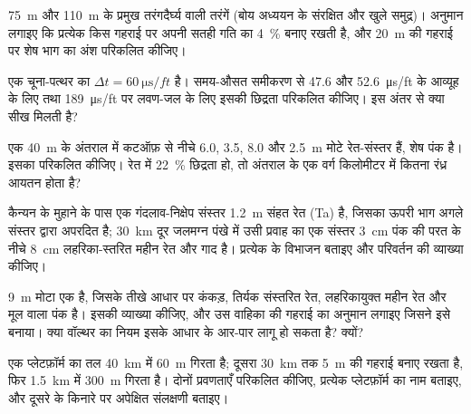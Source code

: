 \begin{exercise}[$\star$]\label{exo:b3:facies-models:4}
\qty{75}{m} और \qty{110}{m} के प्रमुख तरंगदैर्घ्य वाली तरंगें (बोय अध्ययन के
संरक्षित और खुले समुद्र)। अनुमान लगाइए कि प्रत्येक किस गहराई पर
अपनी सतही गति का \qty{4}{\percent} बनाए रखती है, और
\qty{20}{m} की गहराई पर शेष भाग का अंश परिकलित कीजिए।
\end{exercise}

\begin{exercise}[$\star\star$]\label{exo:b3:facies-models:5}
एक चूना-पत्थर का $\Delta t = \qty{60}{\micro\second/ft}$ है। समय-औसत समीकरण से
47.6 और \qty{52.6}{\micro\second/ft} के आव्यूह के लिए तथा
\qty{189}{\micro\second/ft} पर लवण-जल के लिए इसकी छिद्रता परिकलित कीजिए।
इस अंतर से क्या सीख मिलती है?
\end{exercise}

\begin{exercise}[$\star\star$]\label{exo:b3:facies-models:6}
एक \qty{40}{m} के अंतराल में कटऑफ़ से नीचे 6.0, 3.5, 8.0 और \qty{2.5}{m} मोटे
रेत-संस्तर हैं, शेष पंक है। इसका  परिकलित कीजिए।
रेत में \qty{22}{\percent} छिद्रता हो, तो अंतराल के एक
वर्ग किलोमीटर में कितना रंध्र आयतन होता है?
\end{exercise}

\begin{exercise}[$\star\star$]\label{exo:b3:facies-models:7}
कैन्यन के मुहाने के पास एक गंदलाव-निक्षेप संस्तर \qty{1.2}{m} संहत रेत (Ta) है,
जिसका ऊपरी भाग अगले संस्तर द्वारा अपरदित है; \qty{30}{km} दूर जलमग्न पंखे में उसी प्रवाह का
एक संस्तर \qty{3}{cm} पंक की परत के नीचे \qty{8}{cm} लहरिका-स्तरित महीन रेत और गाद है।
प्रत्येक के विभाजन बताइए और परिवर्तन की व्याख्या कीजिए।
\end{exercise}

\begin{exercise}[$\star\star$]\label{exo:b3:facies-models:8}
\qty{9}{m} मोटा एक  है, जिसके तीखे आधार पर कंकड़,
तिर्यक संस्तरित रेत, लहरिकायुक्त महीन रेत और मूल वाला पंक है। इसकी व्याख्या कीजिए,
और उस वाहिका की गहराई का अनुमान लगाइए जिसने इसे बनाया। क्या वॉल्थर का नियम इसके
आधार के आर-पार लागू हो सकता है? क्यों?
\end{exercise}

\begin{exercise}[$\star\star$]\label{exo:b3:facies-models:9}
एक प्लेटफ़ॉर्म का तल \qty{40}{km} में \qty{60}{m} गिरता है; दूसरा
\qty{30}{km} तक \qty{5}{m} की गहराई बनाए रखता है, फिर \qty{1.5}{km} में \qty{300}{m} गिरता है।
दोनों प्रवणताएँ परिकलित कीजिए, प्रत्येक प्लेटफ़ॉर्म का नाम बताइए, और दूसरे के
किनारे पर अपेक्षित संलक्षणी बताइए।
\end{exercise}

